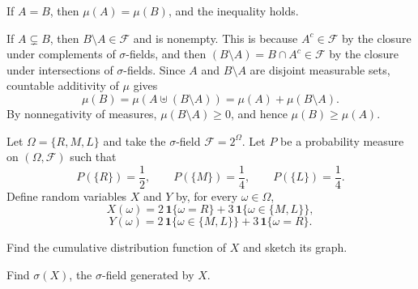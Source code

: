 \documentclass[11pt]{article}
\begin{document}
\begin{solution}
  
  If $A = B$, then $\mu(A) = \mu(B)$, and the inequality holds.

  If $A \subsetneq B$, then $B\setminus A \in \mathcal{F}$ and is nonempty. This is because $A^c \in \mathcal{F}$ by the closure under complements of $\sigma$-fields, and then $(B\setminus A) = B \cap A^c \in \mathcal{F}$ by the closure under intersections of $\sigma$-fields. Since $A$ and $B\setminus A$ are disjoint measurable sets, countable additivity of $\mu$ gives
  \[
    \mu(B) = \mu(A \uplus (B\setminus A)) = \mu(A) + \mu(B\setminus A).
  \]
  By nonnegativity of measures, $\mu(B\setminus A) \geq 0$, and hence $\mu(B) \geq \mu(A)$.

\end{solution}

\begin{problem}[20]
Let $\Omega=\{R,M,L\}$ and take the $\sigma$-field $\mathcal{F}=2^\Omega$. Let $P$ be a
probability measure on $(\Omega,\mathcal{F})$ such that
\[
  P(\{R\})=\frac12,
  \qquad
  P(\{M\})=\frac14,
  \qquad
  P(\{L\})=\frac14.
\]
Define random variables $X$ and $Y$ by, for every $\omega\in\Omega$,
\[
  X(\omega)=2\,\mathbf{1}\{\omega=R\}+3\,\mathbf{1}\{\omega\in\{M,L\}\},
\]
\[
  Y(\omega)=2\,\mathbf{1}\{\omega\in\{M,L\}\}+3\,\mathbf{1}\{\omega=R\}.
\]

\begin{subproblems}
  \item {} Find the cumulative distribution function of $X$ and sketch its graph.

  \item {} Find $\sigma(X)$, the $\sigma$-field generated by $X$.
\end{subproblems}
\end{problem}
\end{document}
